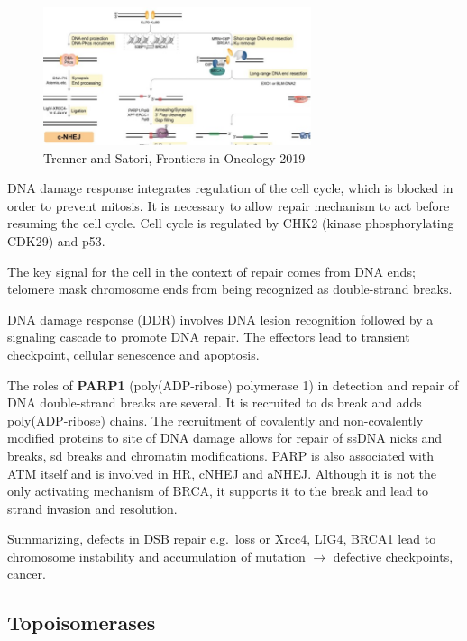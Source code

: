 \begin{figure}
\centering
\includegraphics[width=0.7\textwidth]{../_resources/Picture1.jpg}
\caption{Trenner and Satori, Frontiers in Oncology 2019}
\end{figure}

DNA damage response integrates regulation of the cell cycle, which is blocked in order to prevent mitosis. It is necessary to allow repair mechanism to act before resuming the cell cycle. Cell cycle is regulated by CHK2 (kinase phosphorylating CDK29) and p53.

The key signal for the cell in the context of repair comes from DNA ends; telomere mask chromosome ends from being recognized as double-strand breaks.

DNA damage response (DDR) involves DNA lesion recognition followed by a signaling cascade to promote DNA repair. The effectors lead to transient checkpoint, cellular senescence and apoptosis.

The roles of\textbf{ PARP1} (poly(ADP-ribose) polymerase 1) in detection and repair of DNA double-strand breaks are several. It is recruited to ds break and adds poly(ADP-ribose) chains. The recruitment of covalently and non-covalently modified proteins to site of DNA damage allows for repair of ssDNA nicks and breaks, sd breaks and chromatin modifications. PARP is also associated with ATM itself and is involved in HR, cNHEJ and aNHEJ. Although it is not the only activating mechanism of BRCA, it supports it to the break and lead to strand invasion and resolution.

Summarizing, defects in DSB repair e.g.~loss or Xrcc4, LIG4, BRCA1 lead to chromosome instability and accumulation of mutation $\rightarrow$ defective checkpoints, cancer.

\hypertarget{topoisomerases}{%
\subsection{Topoisomerases}\label{topoisomerases}}

